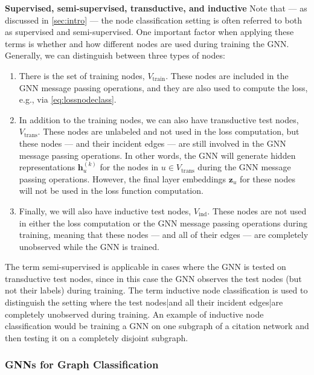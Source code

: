 \documentclass[10pt]{book}
\begin{document}
\textbf{Supervised, semi-supervised, transductive, and inductive} Note
that --- as discussed in \autoref{sec:intro} --- the node classification setting is often referred to both as supervised and semi-supervised. One important factor when applying these terms is whether and how different nodes are used during training the GNN. Generally, we can distinguish between three types of nodes:
\begin{enumerate}
    \item There is the set of training nodes, $V_\text{train}$. These nodes are included in the GNN message passing operations, and they are also used to compute the loss, e.g., via \autoref{eq:lossnodeclass}.

    \item In addition to the training nodes, we can also have transductive test nodes, $V_\text{trans}$. These nodes are unlabeled and not used in the loss computation, but these nodes --- and their incident edges --- are still involved in the GNN message passing operations. In other words, the GNN will generate hidden representations $\mathbf h_u^{(k)}$ for the nodes in $u \in V_\text{trans}$ during the GNN message passing operations. However, the final layer embeddings $\mathbf z_u$ for these nodes will not be used in the loss function computation.
    
    \item  Finally, we will also have inductive test nodes, $V_\text{ind}$. These nodes are not used in either the loss computation or the GNN message passing operations during training, meaning that these nodes --- and all of their edges --- are completely unobserved while the GNN is trained.
\end{enumerate}

The term semi-supervised is applicable in cases where the GNN is tested on transductive test nodes, since in this case the GNN observes the test nodes (but not their labels) during training. The term inductive node classification is used to distinguish the setting where the test nodes|and all their incident edges|are completely unobserved during training. An example of inductive node classification would be training a GNN on one subgraph of a citation network and then testing it on a completely disjoint subgraph.

\subsubsection{GNNs for Graph Classification}
\end{document}

